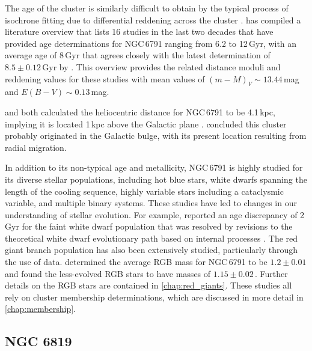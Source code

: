The age of the cluster is similarly difficult to obtain by the typical process of isochrone fitting due to differential reddening across the cluster \citep{brogaard_age_2012}. \cite{wu_asteroseismic_2014} has compiled a literature overview that lists 16 studies in the last two decades that have provided age determinations for NGC\,6791 ranging from 6.2 to 12\,Gyr, with an average age of \texttildelow{}8\,Gyr that agrees closely with the latest determination of $8.5 \pm 0.12$\,Gyr by \cite{hoyman_analysis_2019}. This overview provides the related distance moduli and reddening values for these studies with mean values of $(m-M)_V \sim 13.44$\,mag and $E(B-V) \sim 0.13$\,mag. 

\cite{king_color-magnitude_2005} and \cite{basu_sounding_2011} both calculated the heliocentric distance for NGC\,6791 to be \texttildelow{}4.1\,kpc, implying it is located \texttildelow{}1\,kpc above the Galactic plane \cite[see also ][]{cantat-gaudin_gaia_2018,grundahl_new_2008}. \cite{villanova_ngc_2018} concluded this cluster probably originated in the Galactic bulge, with its present location resulting from radial migration. 

In addition to its non-typical age and metallicity, NGC\,6791 is highly studied for its diverse stellar populations, including hot blue stars, white dwarfs spanning the length of the cooling sequence, highly variable stars including a cataclysmic variable, and multiple binary systems. These studies have led to changes in our understanding of stellar evolution. For example, \cite{bedin_reaching_2008} reported an age discrepancy of 2\,Gyr for the faint white dwarf population that was resolved by revisions to the theoretical white dwarf evolutionary path based on internal processes \citep{garcia-berro_white_2010}. The red giant branch population has also been extensively studied, particularly through the use of \Kepler{} data. \cite{basu_sounding_2011} determined the average RGB mass for NGC\,6791 to be $1.2 \pm 0.01$\,\Msol{} and \cite{brogaard_age_2012} found the less-evolved RGB stars to have masses of $1.15 \pm 0.02$\,\Msol{}. Further details on the RGB stars are contained in \cref{chap:red_giants}. These studies all rely on cluster membership determinations, which are discussed in more detail in \cref{chap:membership}.

\subsection{NGC 6819}

